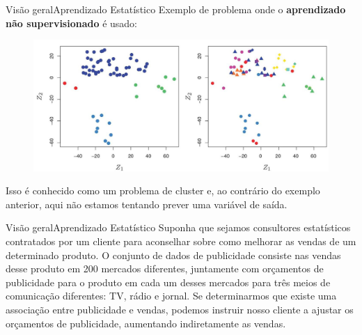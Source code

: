 \documentclass[t]{beamer}
\begin{document}
\begin{ftst}{Visão geral}{{Aprendizado Estatístico}}
\justifying
Exemplo de problema onde o \textbf{aprendizado não supervisionado} é usado:
 
\vone
\begin{figure}
    \centering
    \includegraphics[scale=0.9, trim={0 0 5cm 0 },clip]{Figuras/slide03_03.jpg}
\end{figure}
\small
Isso é conhecido como um problema de cluster e, ao contrário do exemplo anterior, aqui não estamos tentando prever uma variável de saída.
\end{ftst}



\begin{ftst}{Visão geral}{{Aprendizado Estatístico}}
\justifying
Suponha que sejamos consultores estatísticos contratados por um cliente para aconselhar sobre como melhorar as vendas de um determinado produto.
\vone
O conjunto de dados de publicidade consiste nas vendas desse produto em 200 mercados diferentes, juntamente com orçamentos de publicidade para o produto em cada um desses mercados para três meios de comunicação diferentes: TV, rádio e jornal.
\vone
Se determinarmos que existe uma associação entre publicidade e vendas, podemos instruir nosso cliente a ajustar os orçamentos de publicidade, aumentando indiretamente as vendas.

\end{ftst}

\end{document}
